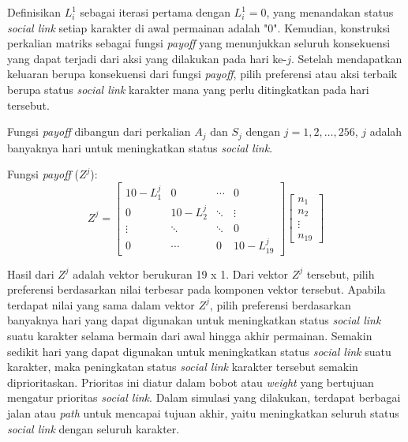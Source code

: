 Definisikan $L_{i}^{1}$ sebagai iterasi pertama dengan $L_{i}^{1} = 0$, yang menandakan status \textit{social link} setiap karakter di awal permainan adalah "0". Kemudian, konstruksi perkalian matriks sebagai fungsi \textit{payoff} yang menunjukkan seluruh konsekuensi yang dapat terjadi dari aksi yang dilakukan pada hari ke-$j$. Setelah mendapatkan keluaran berupa konsekuensi dari fungsi \textit{payoff}, pilih preferensi atau aksi terbaik berupa status \textit{social link} karakter mana yang perlu ditingkatkan pada hari tersebut.

Fungsi \textit{payoff} dibangun dari perkalian $A_{j}$ dan $S_{j}$ dengan $j = 1,2,\dots,256$, $j$ adalah banyaknya hari untuk meningkatkan status \textit{social link}.

Fungsi \textit{payoff} ($Z^{j}$):
\[
    Z^{j} =
    \begin{bmatrix}
        10-L_{1}^{j} & 0            & \cdots & 0             \\
        0            & 10-L_{2}^{j} & \ddots & \vdots        \\
        \vdots       & \ddots       & \ddots & 0             \\
        0            & \cdots       & 0      & 10-L_{19}^{j}
    \end{bmatrix}
    \begin{bmatrix}
        n_{1}  \\
        n_{2}  \\
        \vdots \\
        n_{19}
    \end{bmatrix}
\]

Hasil dari $Z^{j}$ adalah vektor berukuran 19 x 1. Dari vektor $Z^{j}$ tersebut, pilih preferensi berdasarkan nilai terbesar pada komponen vektor tersebut. Apabila terdapat nilai yang sama dalam vektor $Z^{j}$, pilih preferensi berdasarkan banyaknya hari yang dapat digunakan untuk meningkatkan status \textit{social link} suatu karakter selama bermain dari awal hingga akhir permainan. Semakin sedikit hari yang dapat digunakan untuk meningkatkan status \textit{social link} suatu karakter, maka peningkatan status \textit{social link} karakter tersebut semakin diprioritaskan. Prioritas ini diatur dalam bobot atau \textit{weight} yang bertujuan mengatur prioritas \textit{social link}. Dalam simulasi yang dilakukan, terdapat berbagai jalan atau \textit{path} untuk mencapai tujuan akhir, yaitu meningkatkan seluruh status \textit{social link} dengan seluruh karakter.

